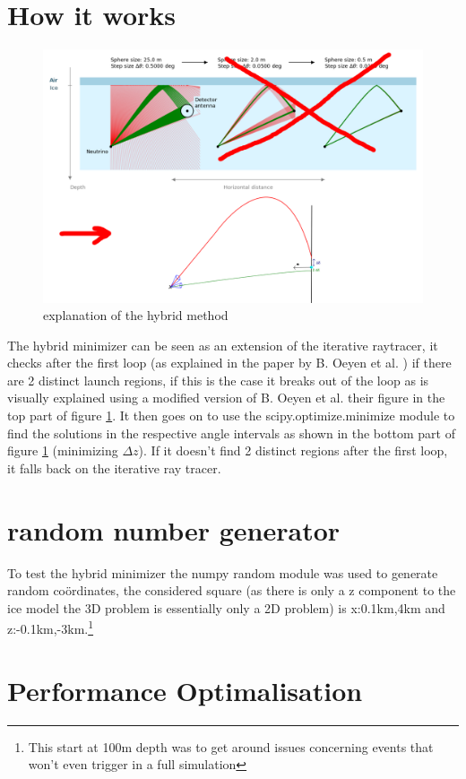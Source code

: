 \documentclass[11pt,a4paper,faculty=we,language=en,doctype=report]{cls/ugent-doc}
\begin{document}
\section{How it works}
\begin{figure}[h!]
	\centering
	\includegraphics[width=\textwidth]{figures/explanation.png}
	\caption{explanation of the hybrid method}
	\label{fig:explanation}
\end{figure}
The hybrid minimizer can be seen as an extension of the iterative raytracer, it
checks after the first loop (as explained in the paper by B. Oeyen et al.
\cite{2022icrc.confE1027O}) if there are 2 distinct launch regions, if this is
the case it breaks out of the loop 
as is visually explained using a modified version of B. Oeyen et al. their figure in the top
part of figure \ref{fig:explanation}. 
It then goes on to use the scipy.optimize.minimize module
to find the solutions in the respective angle intervals
as shown in the bottom part of figure \ref{fig:explanation} (minimizing $\Delta z$). If it doesn't find 2
distinct regions after the first loop, it falls back on the iterative ray tracer. 
\section{random number generator}
To test the hybrid minimizer the numpy random module was used to generate
random coördinates, the considered square (as there is only a z component to the
ice model the 3D problem is essentially only a 2D problem) is x:0.1km,4km and
z:-0.1km,-3km.\footnote{This start at 100m depth was to get around issues concerning events that 
won't even trigger in a full simulation}
\section{Performance Optimalisation}
\end{document}
